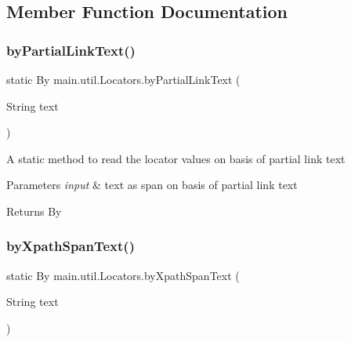 \subsection{Member Function Documentation}
\mbox{\label{classmain_1_1util_1_1_locators_a19c55393acbfebff041901aa2917d489}} 
\subsubsection{\texorpdfstring{by\+Partial\+Link\+Text()}{byPartialLinkText()}}
{\footnotesize\ttfamily static By main.\+util.\+Locators.\+by\+Partial\+Link\+Text (\begin{DoxyParamCaption}\item[{String}]{text }\end{DoxyParamCaption})\hspace{0.3cm}{\ttfamily [static]}}

A static method to read the locator values on basis of partial link text 
\begin{DoxyParams}{Parameters}
{\em input} & text as span on basis of partial link text \\
\hline
\end{DoxyParams}
\begin{DoxyReturn}{Returns}
By 
\end{DoxyReturn}
\mbox{\label{classmain_1_1util_1_1_locators_a2aff991dbee052ae04c110eaa6a94686}} 
\subsubsection{\texorpdfstring{by\+Xpath\+Span\+Text()}{byXpathSpanText()}}
{\footnotesize\ttfamily static By main.\+util.\+Locators.\+by\+Xpath\+Span\+Text (\begin{DoxyParamCaption}\item[{String}]{text }\end{DoxyParamCaption})\hspace{0.3cm}{\ttfamily [static]}}

